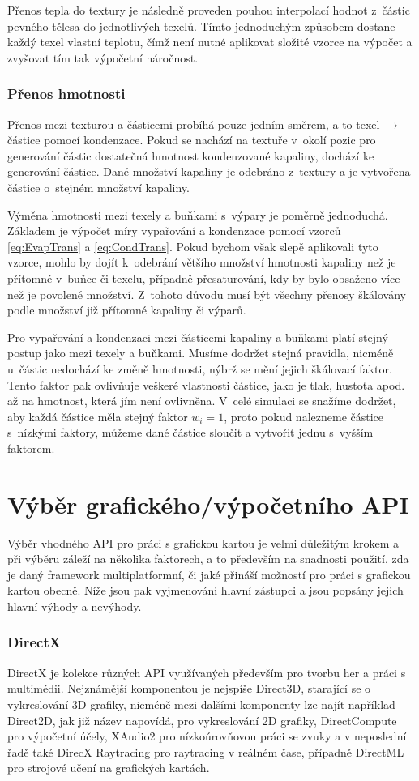 Přenos tepla do textury je následně proveden pouhou interpolací hodnot z~částic pevného tělesa do jednotlivých texelů. Tímto jednoduchým způsobem dostane každý texel vlastní teplotu, čímž není nutné aplikovat složité vzorce na výpočet a zvyšovat tím tak výpočetní náročnost.

\subsubsection{Přenos hmotnosti}
Přenos mezi texturou a částicemi probíhá pouze jedním směrem, a to texel $\rightarrow$ částice pomocí kondenzace. Pokud se nachází na textuře v~okolí pozic pro generování částic dostatečná hmotnost kondenzované kapaliny, dochází ke generování částice. Dané množství kapaliny je odebráno z~textury a je vytvořena částice o~stejném množství kapaliny.

Výměna hmotnosti mezi texely a buňkami s~výpary je poměrně jednoduchá. Základem je výpočet míry vypařování a kondenzace pomocí vzorců \ref{eq:EvapTrans} a \ref{eq:CondTrans}. Pokud bychom však slepě aplikovali tyto vzorce, mohlo by dojít k~odebrání většího množství hmotnosti kapaliny než je přítomné v~buňce či texelu, případně přesaturování, kdy by bylo obsaženo více než je povolené množství. Z~tohoto důvodu musí být všechny přenosy škálovány podle množství již přítomné kapaliny či výparů.

Pro vypařování a kondenzaci mezi částicemi kapaliny a buňkami platí stejný postup jako mezi texely a buňkami. Musíme dodržet stejná pravidla, nicméně u~částic nedochází ke změně hmotnosti, nýbrž se mění jejich škálovací faktor. Tento faktor pak ovlivňuje veškeré vlastnosti částice, jako je tlak, hustota apod. až na hmotnost, která jím není ovlivněna. V~celé simulaci se snažíme dodržet, aby každá částice měla stejný faktor $w_i = 1$, proto pokud nalezneme částice s~nízkými faktory, můžeme dané částice sloučit a vytvořit jednu s~vyšším faktorem.

\section{Výběr grafického/výpočetního API}
Výběr vhodného API pro práci s grafickou kartou je velmi důležitým krokem a při výběru záleží na několika faktorech, a to především na snadnosti použití, zda je daný framework multiplatformní, či jaké přináší možností pro práci s grafickou kartou obecně. Níže jsou pak vyjmenováni hlavní zástupci a jsou popsány jejich hlavní výhody a nevýhody.
\subsubsection{DirectX}
DirectX je kolekce různých API využívaných především pro tvorbu her a práci s multimédii. Nejznámější komponentou je nejspíše Direct3D, starající se o vykreslování 3D grafiky, nicméně mezi dalšími komponenty lze najít například Direct2D, jak již název napovídá, pro vykreslování 2D grafiky, DirectCompute pro výpočetní účely, XAudio2 pro nízkoúrovňovou práci se zvuky a v neposlední řadě také DirecX Raytracing pro raytracing v reálném čase, případně DirectML pro strojové učení na grafických kartách. \cite{pcmag}

